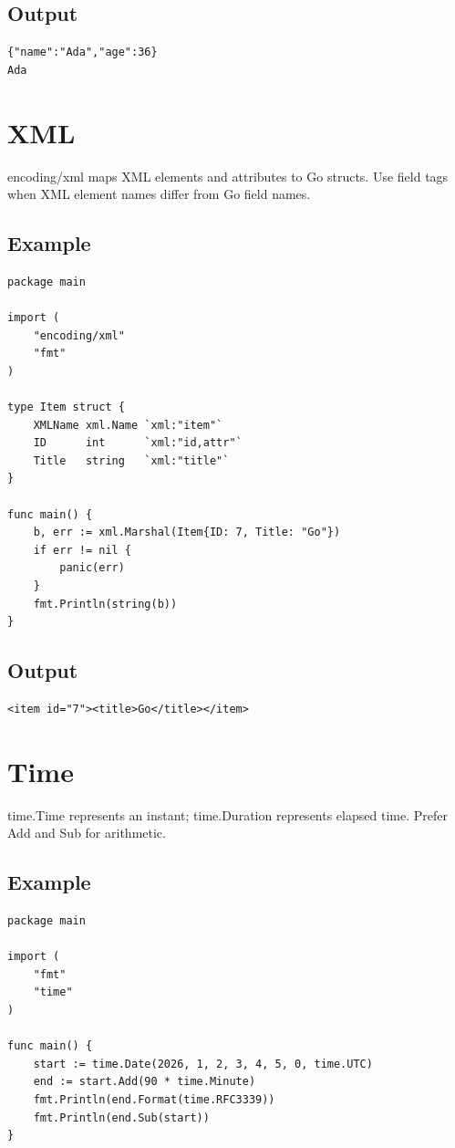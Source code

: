 \documentclass[10pt,oneside]{article}
\newcommand{\sectionline}{\par\vspace{4pt}{\color{rule}\hrule height .5pt}\vspace{7pt}\color{ink}\noindent}
\begin{document}
\subsection*{Output}
\begin{lstlisting}[style=terminal]
{"name":"Ada","age":36}
Ada
\end{lstlisting}
\clearpage
\section{XML}
\sectionline
encoding/xml maps XML elements and attributes to Go structs. Use field tags when XML element names differ from Go field names.\par
\subsection*{Example}
\begin{lstlisting}[style=gocode]
package main

import (
	"encoding/xml"
	"fmt"
)

type Item struct {
	XMLName xml.Name `xml:"item"`
	ID      int      `xml:"id,attr"`
	Title   string   `xml:"title"`
}

func main() {
	b, err := xml.Marshal(Item{ID: 7, Title: "Go"})
	if err != nil {
		panic(err)
	}
	fmt.Println(string(b))
}
\end{lstlisting}
\subsection*{Output}
\begin{lstlisting}[style=terminal]
<item id="7"><title>Go</title></item>
\end{lstlisting}
\clearpage
\section{Time}
\sectionline
time.Time represents an instant; time.Duration represents elapsed time. Prefer Add and Sub for arithmetic.\par
\subsection*{Example}
\begin{lstlisting}[style=gocode]
package main

import (
	"fmt"
	"time"
)

func main() {
	start := time.Date(2026, 1, 2, 3, 4, 5, 0, time.UTC)
	end := start.Add(90 * time.Minute)
	fmt.Println(end.Format(time.RFC3339))
	fmt.Println(end.Sub(start))
}
\end{lstlisting}
\end{document}
